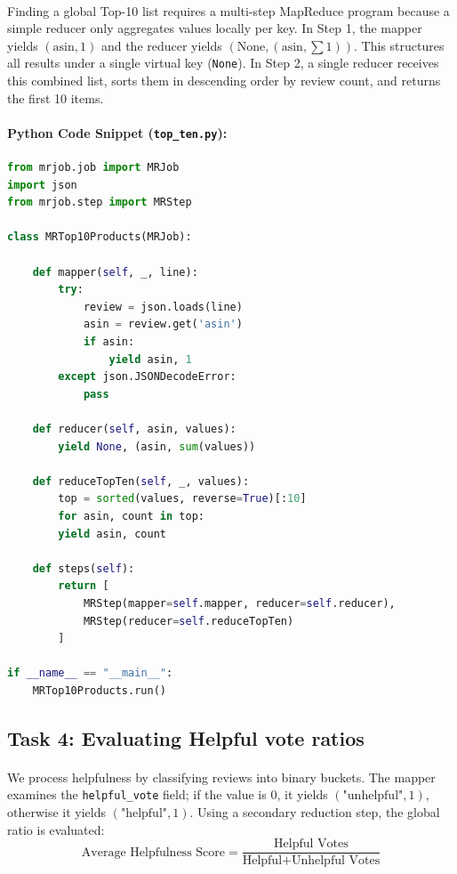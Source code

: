 \documentclass[12pt, a4paper]{article}
\begin{document}
	\paragraph{} 
	Finding a global Top-10 list requires a multi-step MapReduce program because a simple reducer only aggregates values locally per key. 
	In Step 1, the mapper yields $(\text{asin}, 1)$ and the reducer yields $(\text{None}, (\text{asin}, \sum 1))$. This structures all results under a single virtual key (\texttt{None}).
	In Step 2, a single reducer receives this combined list, sorts them in descending order by review count, and returns the first 10 items.
	
	\paragraph{Python Code Snippet (\texttt{top\_ten.py}):}
	\begin{lstlisting}[language=Python, caption={Multi-step  job to isolate top ten reviewed items.}]
from mrjob.job import MRJob
import json
from mrjob.step import MRStep

class MRTop10Products(MRJob):

	def mapper(self, _, line):
		try:
			review = json.loads(line)
			asin = review.get('asin')
			if asin:
				yield asin, 1
		except json.JSONDecodeError:
			pass
	
	def reducer(self, asin, values):
		yield None, (asin, sum(values))
	
	def reduceTopTen(self, _, values):
		top = sorted(values, reverse=True)[:10]
		for asin, count in top:
		yield asin, count
	
	def steps(self):
		return [
			MRStep(mapper=self.mapper, reducer=self.reducer),
			MRStep(reducer=self.reduceTopTen)       
		]
	
if __name__ == "__main__":
	MRTop10Products.run()
	\end{lstlisting}

	
	\subsection{Task 4: Evaluating Helpful vote ratios}
	\paragraph{} 
	We process helpfulness by classifying reviews into binary buckets. The mapper examines the \texttt{helpful\_vote} field; if the value is $0$, it yields $(\text{"unhelpful"}, 1)$, otherwise it yields $(\text{"helpful"}, 1)$. 
	Using a secondary reduction step, the global ratio is evaluated:
	$$\text{Average Helpfulness Score} = \frac{\text{Helpful Votes}}{\text{Helpful} + \text{Unhelpful Votes}}$$
	
\end{document}
